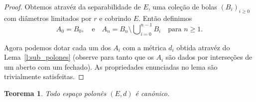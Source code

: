 \documentclass[reqno, draft]{book}
\newcommand*\1{\mathds{1}}
\newtheorem{theorem}{Teorema}[section]
\DeclareMathOperator*{\mcup}{{\textstyle \bigcup}}
\begin{document}
\begin{proof}
  Obtemos atravéz da separabilidade de $E$, uma coleção de bolas $(B_i)_{i \geq 0}$ com diâmetros limitados por $r$ e cobrindo $E$.
  Então definimos
  \begin{equation}
    A_0 = B_0, \quad \text{e} \quad A_n = B_n \setminus \mcup_{i=0}^{n-1} B_i \quad \text{para $n \geq 1$.}
  \end{equation}

  Agora podemos dotar cada um dos $A_i$ com a métrica $d_i$ obtida atravéz do Lema~\ref{l:sub_polones} (observe para tanto que os $A_i$ são dados por interseções de um aberto com um fechado).
  As propriedades enunciadas no lema são trivialmente satisfeitas.
\end{proof}

\begin{theorem}
  Todo espaço polonês $(E, d)$ é canônico.
\end{theorem}
\end{document}
